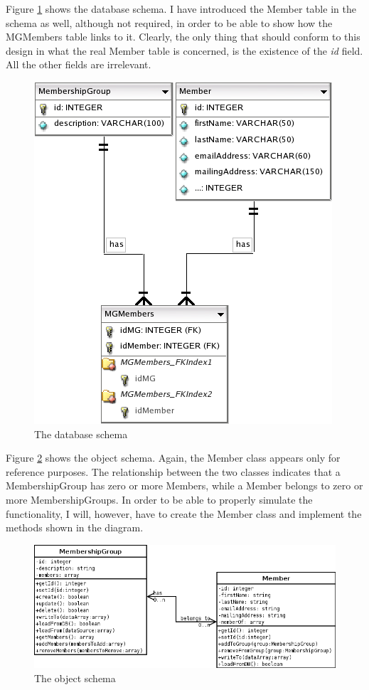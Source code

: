 \documentclass[a4paper,oneside]{article}
\begin{document}
Figure \ref{fig:dbs} shows the database schema. I have introduced the Member table in the schema
as well, although not required, in order to be able to show how the MGMembers table links to it.
Clearly, the only thing that should conform to this design in what the real Member table is
concerned, is the existence of the \emph{id} field. All the other fields are irrelevant.
\\
\begin{figure}[ht]
	\centering
	\includegraphics[bb=0 0 165 189]{db-schema.png}
	\caption{The database schema}
	\label{fig:dbs}
\end{figure}

Figure \ref{fig:os} shows the object schema. Again, the Member class appears only for reference
purposes. The relationship between the two classes indicates that a MembershipGroup has zero or
more Members, while a Member belongs to zero or more MembershipGroups. In order to be able to
properly simulate the functionality, I will, however, have to create the Member class and implement
the methods shown in the diagram.
\\
\begin{figure}[ht]
	\centering
	\includegraphics[bb=0 0 282 103]{obj-schema.png}
	\caption{The object schema}
	\label{fig:os}
\end{figure}
\end{document}
